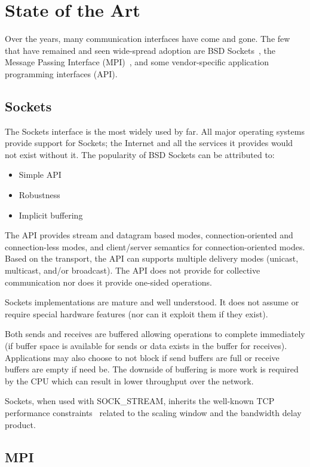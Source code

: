 \section{State of the Art}
\label{sec:state}
Over the years, many communication interfaces have come and gone. The few that have
remained and seen wide-spread adoption are BSD Sockets~\cite{Sechrest:CSD-84-191}, the Message Passing
Interface (MPI)~\cite{mpi_forum93:_mpi}, and some vendor-specific application programming interfaces
(API).

\subsection{Sockets} The Sockets interface is the most widely used by far. All major
operating systems provide support for Sockets; the Internet and all the services it
provides would not exist without it. The popularity of BSD Sockets can be attributed to:

\begin{itemize}
\item Simple API
\item Robustness
\item Implicit buffering
\end{itemize}

The API provides stream and datagram based modes, connection-oriented and connection-less
modes, and client/server semantics for connection-oriented modes. Based on the transport,
the API can supports multiple delivery modes (unicast, multicast, and/or broadcast). The
API does not provide for collective communication nor does it provide one-sided
operations.

Sockets implementations are mature and well understood. It does not assume or require
special hardware features (nor can it exploit them if they exist).

Both sends and receives are buffered allowing operations to complete immediately (if buffer
space is available for sends or data exists in the buffer for receives). Applications may
also choose to not block if send buffers are full or receive buffers are empty if need be.
The downside of buffering is more work is required by the CPU which can result in lower
throughput over the network.

Sockets, when used with SOCK\_STREAM, inherits the well-known TCP
performance constraints~\cite{Foong03tcpperformance} related to the
scaling window and the bandwidth delay product. 

\subsection{MPI}
\label{sec:mpi} 

